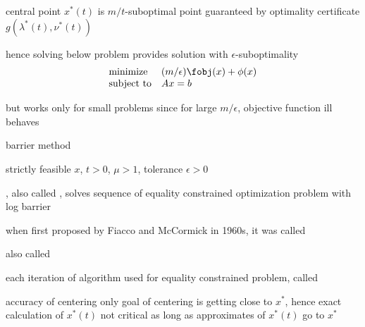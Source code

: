 \documentclass[17pt,landscape]{foils}
\begin{document}
{

\bit
\item
	central point $x^\ast(t)$ is $m/t$-suboptimal point
	guaranteed by optimality certificate $g(\lambda^\ast(t),\nu^\ast(t))$

\vitem
	hence solving below problem provides solution with $\epsilon$-suboptimality
	$$
		\begin{array}{ll}
			\mbox{minimize} &
				(m/\epsilon) \fobj(x) + \phi(x)
			\\
			\mbox{subject to} &
				Ax=b
		\end{array}
	$$

\vitem
	but works only for small problems
	since for large $m/\epsilon$,
	objective function ill behaves
\eit
\vfill



\begin{myalgorithm}{barrier method}\;%
\begin{algorithmic}
\Require strictly feasible $x$, $t>0$, $\mu>1$, tolerance $\epsilon>0$
\Repeat
\Until
\end{algorithmic}
\end{myalgorithm}
\bit
\item
	, also called ,
	solves sequence of equality constrained optimization problem with log barrier
	\bit
	\item
		when first proposed by Fiacco and McCormick in 1960s,
		it was called 
	\eit
\item
	 also called 
\item
	each iteration of algorithm used for equality constrained problem,
	called 
\eit



\bit
\item
	accuracy of centering
	\bit
	\vitem
		only goal of centering is getting close to $x^\ast$,
		hence exact calculation of $x^\ast(t)$ not critical
		as long as approximates of $x^\ast(t)$ go to $x^\ast$

}
\end{document}
